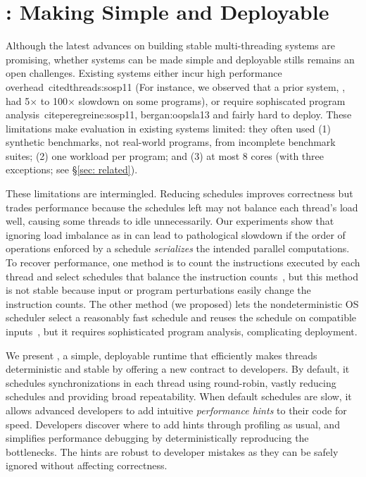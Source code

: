 \section{\parrot: Making \smt Simple and Deployable} \label{sec:parrot}

Although the latest advances on building stable
multi-threading systems are promising, whether \smt systems can be 
made simple and deployable stills remains an open challenges. Existing systems 
either incur high performance overhead~cite{dthreads:sosp11} (For instance, 
we observed that a prior system, \dthreads, had 5$\times$ to 100$\times$ slowdown on
some programs), or require sophiscated program analysis~cite{peregreine:sosp11, bergan:oopsla13}
and fairly hard to deploy.
These limitations make evaluation in existing systems limited: they often 
used (1) synthetic benchmarks,
not real-world programs, from incomplete benchmark suites; (2) one workload
per program; and (3) at most 8 cores (with three exceptions; see \S\ref{sec:
related}).

These limitations are intermingled.  Reducing schedules improves correctness
but trades performance because the schedules left may not balance each
thread's load well, causing some threads to idle unnecessarily.  Our
experiments show that ignoring load imbalance as in \dthreads
can lead to pathological
slowdown if the order of operations enforced by a schedule
\emph{serializes} the intended parallel computations.
To recover performance, one method is to count
the instructions executed by each thread and select schedules that balance
the instruction counts~\cite{kendo:asplos09, coredet:asplos10,
  dmp:asplos09}, but this method is not stable because input or program
perturbations easily change the instruction counts.  The other method (we 
proposed)
lets the nondeterministic OS scheduler select
a reasonably fast schedule and reuses the schedule on
compatible inputs~\cite{cui:tern:osdi10,peregrine:sosp11}, but it
requires sophisticated program analysis, complicating deployment.

We present \parrot, a simple, deployable runtime that efficiently makes
threads deterministic and stable by offering a new contract to developers.
By default, it schedules synchronizations in each thread using
round-robin, vastly reducing schedules and providing broad repeatability.
When default schedules are slow, it allows advanced developers to add
intuitive \emph{performance hints} to their code for speed.  Developers 
discover
where to add hints through profiling as usual, and \parrot simplifies
performance debugging by deterministically reproducing the bottlenecks.
The hints are robust to developer mistakes as they can be safely ignored
without affecting correctness.

